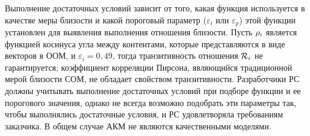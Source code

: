 Выполнение достаточных условий зависит от того, какая
функция используется в качестве меры близости и какой пороговый
параметр ($\varepsilon_{i}$ или $\varepsilon_p$) этой функции
установлен для выявления выполнения отношения близости.
Пусть $\mathcal{\rho}_i$ является функцией косинуса угла между контентами, которые
представляются в виде векторов в ООМ, и $\varepsilon_i = 0,49$, тогда
транзитивность отношения $\mathcal{R}_i$ не гарантируется; коэффициент корреляции Пирсона,
являющийся традиционной мерой близости СОМ, не обладает свойством
транзитивности. Разработчики РС должны учитывать выполнение достаточных условий
при подборе функции и ее порогового значения, однако не всегда возможно
подобрать эти параметры так, чтобы выполнялись достаточные условия, и РС
удовлетворяла требованиям заказчика. В общем случае АКМ не являются
качественными моделями.

